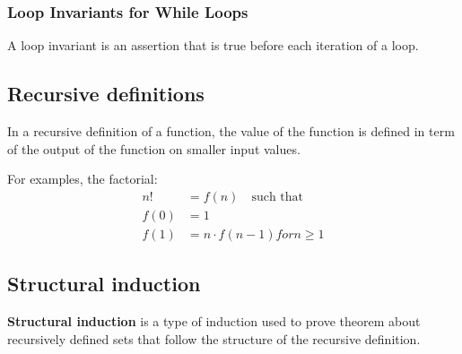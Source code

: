 \subsubsection*{Loop Invariants for While Loops}
A loop invariant is an assertion that is true before each iteration of a loop.

\subsection{Recursive definitions}
In a recursive definition of a function, the value of the function is defined in term
of the output of the function on smaller input values.

For examples, the factorial:
\begin{align*}
  n!   & = f(n)\quad\text{such that}   \\
  f(0) & = 1                           \\
  f(1) & = n \cdot f(n-1) for n \geq 1
\end{align*}

\subsection{Structural induction}
\textbf{Structural induction} is a type of induction used to prove theorem about recursively
defined sets that follow the structure of the recursive definition.

